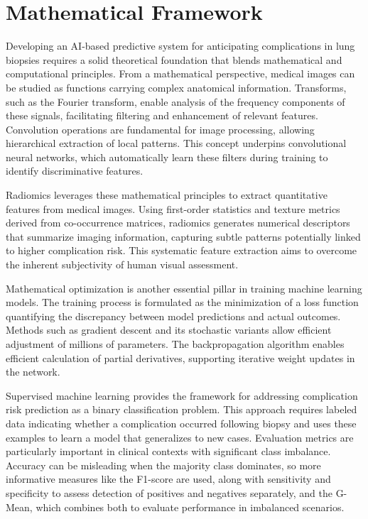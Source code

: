 \section*{Mathematical Framework}

Developing an AI-based predictive system for anticipating complications in lung biopsies requires a solid theoretical foundation that blends mathematical and computational principles. From a mathematical perspective, medical images can be studied as functions carrying complex anatomical information. Transforms, such as the Fourier transform, enable analysis of the frequency components of these signals, facilitating filtering and enhancement of relevant features. Convolution operations are fundamental for image processing, allowing hierarchical extraction of local patterns. This concept underpins convolutional neural networks, which automatically learn these filters during training to identify discriminative features.

Radiomics leverages these mathematical principles to extract quantitative features from medical images. Using first-order statistics and texture metrics derived from co-occurrence matrices, radiomics generates numerical descriptors that summarize imaging information, capturing subtle patterns potentially linked to higher complication risk. This systematic feature extraction aims to overcome the inherent subjectivity of human visual assessment.

Mathematical optimization is another essential pillar in training machine learning models. The training process is formulated as the minimization of a loss function quantifying the discrepancy between model predictions and actual outcomes. Methods such as gradient descent and its stochastic variants allow efficient adjustment of millions of parameters. The backpropagation algorithm enables efficient calculation of partial derivatives, supporting iterative weight updates in the network.

Supervised machine learning provides the framework for addressing complication risk prediction as a binary classification problem. This approach requires labeled data indicating whether a complication occurred following biopsy and uses these examples to learn a model that generalizes to new cases. Evaluation metrics are particularly important in clinical contexts with significant class imbalance. Accuracy can be misleading when the majority class dominates, so more informative measures like the F1-score are used, along with sensitivity and specificity to assess detection of positives and negatives separately, and the G-Mean, which combines both to evaluate performance in imbalanced scenarios.

